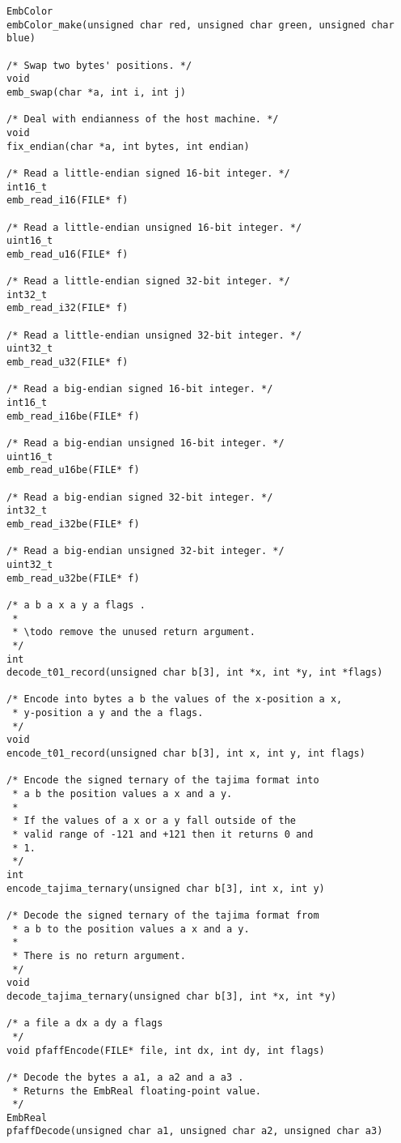\begin{lstlisting}
EmbColor
embColor_make(unsigned char red, unsigned char green, unsigned char blue)

/* Swap two bytes' positions. */
void
emb_swap(char *a, int i, int j)

/* Deal with endianness of the host machine. */
void
fix_endian(char *a, int bytes, int endian)

/* Read a little-endian signed 16-bit integer. */
int16_t
emb_read_i16(FILE* f)

/* Read a little-endian unsigned 16-bit integer. */
uint16_t
emb_read_u16(FILE* f)

/* Read a little-endian signed 32-bit integer. */
int32_t
emb_read_i32(FILE* f)

/* Read a little-endian unsigned 32-bit integer. */
uint32_t
emb_read_u32(FILE* f)

/* Read a big-endian signed 16-bit integer. */
int16_t
emb_read_i16be(FILE* f)

/* Read a big-endian unsigned 16-bit integer. */
uint16_t
emb_read_u16be(FILE* f)

/* Read a big-endian signed 32-bit integer. */
int32_t
emb_read_i32be(FILE* f)

/* Read a big-endian unsigned 32-bit integer. */
uint32_t
emb_read_u32be(FILE* f)

/* a b a x a y a flags .
 *
 * \todo remove the unused return argument.
 */
int
decode_t01_record(unsigned char b[3], int *x, int *y, int *flags)

/* Encode into bytes a b the values of the x-position a x,
 * y-position a y and the a flags.
 */
void
encode_t01_record(unsigned char b[3], int x, int y, int flags)

/* Encode the signed ternary of the tajima format into
 * a b the position values a x and a y.
 *
 * If the values of a x or a y fall outside of the
 * valid range of -121 and +121 then it returns 0 and
 * 1.
 */
int
encode_tajima_ternary(unsigned char b[3], int x, int y)

/* Decode the signed ternary of the tajima format from
 * a b to the position values a x and a y.
 *
 * There is no return argument.
 */
void
decode_tajima_ternary(unsigned char b[3], int *x, int *y)

/* a file a dx a dy a flags
 */
void pfaffEncode(FILE* file, int dx, int dy, int flags)

/* Decode the bytes a a1, a a2 and a a3 .
 * Returns the EmbReal floating-point value.
 */
EmbReal
pfaffDecode(unsigned char a1, unsigned char a2, unsigned char a3)


\end{lstlisting}
